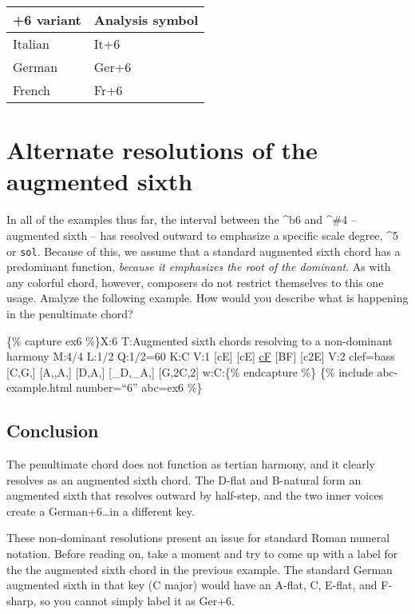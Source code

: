 \documentclass{book}
\begin{document}
\begin{longtable}[]{@{}ll@{}}
\toprule
+6 variant & Analysis symbol \\
\midrule
\endhead
Italian & It+6 \\
German & Ger+6 \\
French & Fr+6 \\
\bottomrule
\end{longtable}

\hypertarget{alternate-resolutions-of-the-augmented-sixth}{%
\section{Alternate resolutions of the augmented
sixth}\label{alternate-resolutions-of-the-augmented-sixth}}

In all of the examples thus far, the interval between the \^{}b6 and \^{}\#4
-- augmented sixth -- has resolved outward to emphasize a specific scale
degree, \^{}5 or \texttt{sol}. Because of this, we assume that a standard
augmented sixth chord has a predominant function, \emph{because it emphasizes
the root of the dominant}. As with any colorful chord, however, composers do
not restrict themselves to this one usage. Analyze the following example. How
would you describe what is happening in the penultimate chord?

\{\% capture ex6 \%\}X:6 T:Augmented sixth chords resolving to a non-dominant
harmony M:4/4 L:1/2 Q:1/2=60 K:C V:1 {[}cE{]} {[}cE{]}\textbar{}
\href{cantusFirmus.html}{cF} {[}BF{]}\textbar{} {[}c2E{]}\textbar{]} V:2
clef=bass {[}C,G,{]} {[}A,,A,{]}\textbar{} {[}D,A,{]} {[}\_D,\_A,{]}\textbar{}
{[}G,2C,2{]}\textbar{]} w:C:\{\% endcapture \%\} \{\% include abc-example.html
number=``6'' abc=ex6 \%\}

\hypertarget{conclusion}{%
\subsection{Conclusion}\label{conclusion}}

The penultimate chord does not function as tertian harmony, and it clearly
resolves as an augmented sixth chord. The D-flat and B-natural form an
augmented sixth that resolves outward by half-step, and the two inner voices
create a German+6\ldots in a different key.

These non-dominant resolutions present an issue for standard Roman numeral
notation. Before reading on, take a moment and try to come up with a label for
the the augmented sixth chord in the previous example. The standard German
augmented sixth in that key (C major) would have an A-flat, C, E-flat, and
F-sharp, so you cannot simply label it as Ger+6.
\end{document}
